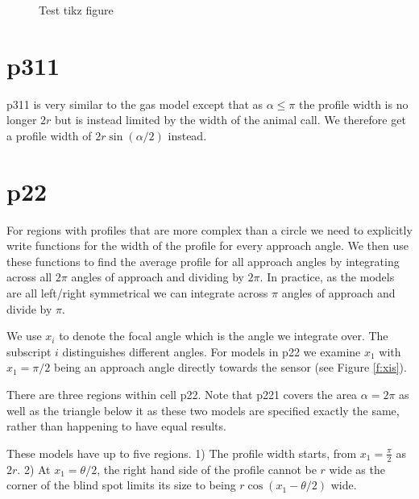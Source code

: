 \begin{figure}[t]
\centering
{}
\caption{Test tikz figure}
\end{figure}


\section{p311} \label{p311}

p311 is very similar to the gas model except that as $\alpha \le \pi$ the profile width is no longer $2r$ but is instead limited by the width of the animal call. We therefore get a profile width of $2r\sin(\alpha/2)$ instead.



\section{p22} \label{p22}

For regions with profiles that are more complex than a circle we need to explicitly write functions for the width of the profile for every approach angle. We then use these functions to find the average profile for all approach angles by integrating across all $2\pi$ angles of approach and dividing by $2\pi$. In practice, as the models are all left/right symmetrical we can integrate across $\pi$ angles of approach and divide by $\pi$.

We use $x_i$ to denote the focal angle which is the angle we integrate over. The subscript $i$ distinguishes different angles. For models in p22 we examine $x_1$ with  $x_1 = \pi/2$ being an approach angle directly towards the sensor (see Figure \ref{f:xis}).

There are three regions within cell p22. Note that p221 covers the area $\alpha=2\pi$ as well as the triangle below it as these two models are specified exactly the same, rather than happening to have equal results.

These models have up to five regions. 1) The profile width starts, from $x_1=\frac{\pi}{2}$ as $2r$. 2) At $x_1 = \theta/2$, the right hand side of the profile cannot be $r$ wide as the corner of the blind spot limits its size to being $r\cos(x_1 - \theta/2)$ wide. 

